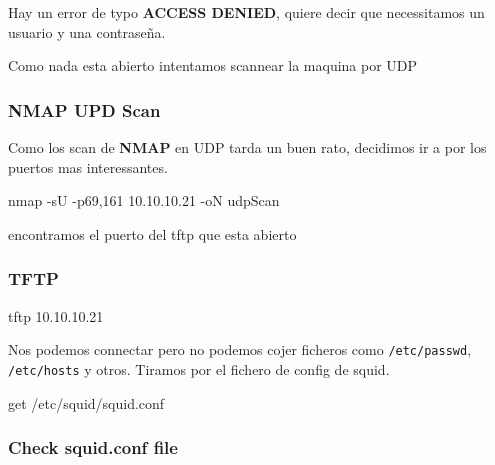 \documentclass{assets/ipesethesis}
\newenvironment{Shaded}{\begin{snugshade}}{\end{snugshade}}
\newcommand{\ExtensionTok}[1]{#1}
\newcommand{\FunctionTok}[1]{\textcolor[rgb]{0.00,0.00,0.00}{#1}}
\newcommand{\NormalTok}[1]{#1}
\begin{document}
Hay un error de typo \textbf{ACCESS DENIED}, quiere decir que necessitamos un usuario y una contraseña.

Como nada esta abierto intentamos scannear la maquina por UDP

\hypertarget{nmap-upd-scan}{%
\subsubsection*{NMAP UPD Scan}\label{nmap-upd-scan}}

Como los scan de \textbf{NMAP} en UDP tarda un buen rato, decidimos ir a por los puertos mas interessantes.

\begin{Shaded}
\begin{Highlighting}[]
\FunctionTok{nmap}\NormalTok{ -sU -p69,161 10.10.10.21 -oN udpScan}
\end{Highlighting}
\end{Shaded}

encontramos el puerto del tftp que esta abierto

\hypertarget{tftp}{%
\subsubsection*{TFTP}\label{tftp}}

\begin{Shaded}
\begin{Highlighting}[]
\ExtensionTok{tftp}\NormalTok{ 10.10.10.21}
\end{Highlighting}
\end{Shaded}

Nos podemos connectar pero no podemos cojer ficheros como \texttt{/etc/passwd}, \texttt{/etc/hosts} y otros. Tiramos por el fichero de config de squid.

\begin{Shaded}
\begin{Highlighting}[]
\ExtensionTok{get}\NormalTok{ /etc/squid/squid.conf}
\end{Highlighting}
\end{Shaded}

\hypertarget{check-squid.conf-file}{%
\subsubsection*{Check squid.conf file}\label{check-squid.conf-file}}
\end{document}
